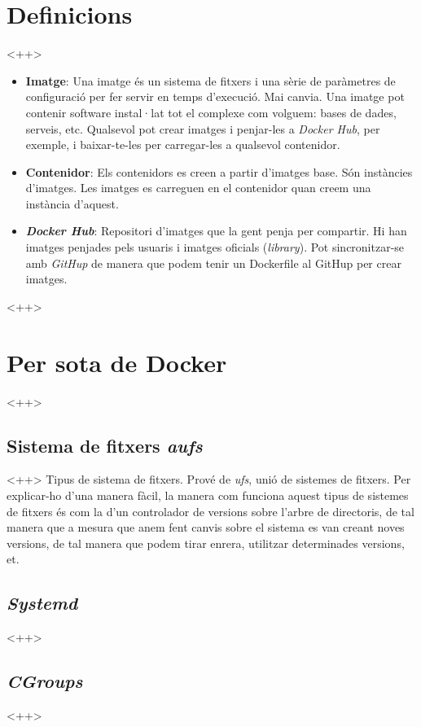 \documentclass[a4paper]{article}
\begin{document}
\section{Definicions}<++>
\begin{itemize}
	\item \textbf{Imatge}: Una imatge \'{e}s un sistema de fitxers i una sèrie de paràmetres de configuració per fer servir en temps d'execució. Mai canvia. Una imatge pot contenir software instal·lat tot el complexe com volguem: bases de dades, serveis, etc. Qualsevol pot crear imatges i penjar-les a \textit{Docker Hub}, per exemple, i baixar-te-les per carregar-les a qualsevol contenidor.
	\item \textbf{Contenidor}: Els contenidors es creen a partir d'imatges base. Són instàncies d'imatges. Les imatges es carreguen en el contenidor quan creem una instància d'aquest.
	\item \textbf{\textit{Docker Hub}}: Repositori d'imatges que la gent penja per compartir. Hi han imatges penjades pels usuaris i imatges oficials (\textit{library}). Pot sincronitzar-se amb \textit{GitHup} de manera que podem tenir un Dockerfile al GitHup per crear imatges.
\end{itemize}<++>

\section{Per sota de Docker}<++>

\subsection{Sistema de fitxers \textit{aufs}}<++>
Tipus de sistema de fitxers. Prov\'{e} de \textit{ufs}, unió de sistemes de fitxers. Per explicar-ho d'una manera fàcil, la manera com funciona aquest tipus de sistemes de fitxers \'{e}s com la d'un controlador de versions sobre l'arbre de directoris, de tal manera que a mesura que anem fent canvis sobre el sistema es van creant noves versions, de tal manera que podem tirar enrera, utilitzar determinades versions, et.

\subsection{\textit{Systemd}}<++>

\subsection{\textit{CGroups}}<++>
\end{document}
